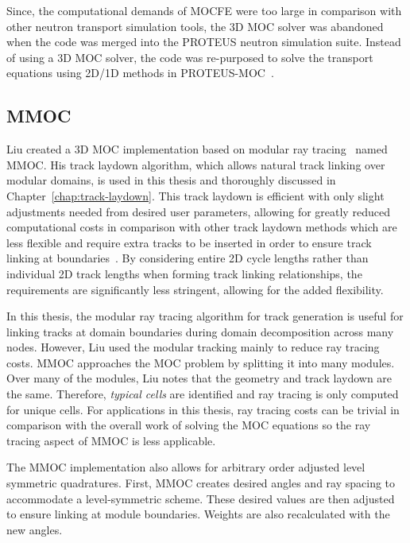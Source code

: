 Since, the computational demands of MOCFE were too large in comparison with other neutron transport simulation tools, the 3D \ac{MOC} solver was abandoned when the code was merged into the PROTEUS neutron simulation suite. Instead of using a 3D \ac{MOC} solver, the code was re-purposed to solve the transport equations using 2D/1D methods in PROTEUS-MOC~\cite{proteus}.

\subsection{MMOC}
\label{sec:mmoc}

Liu created a 3D \ac{MOC} implementation based on modular ray tracing~\cite{liu_mrt} named MMOC. His track laydown algorithm, which allows natural track linking over modular domains, is used in this thesis and thoroughly discussed in Chapter~\ref{chap:track-laydown}. This track laydown is efficient with only slight adjustments needed from desired user parameters, allowing for greatly reduced computational costs in comparison with other track laydown methods which are less flexible and require extra tracks to be inserted in order to ensure track linking at boundaries~\cite{shaner-laydown}. By considering entire 2D cycle lengths rather than individual 2D track lengths when forming track linking relationships, the requirements are significantly less stringent, allowing for the added flexibility.

In this thesis, the modular ray tracing algorithm for track generation is useful for linking tracks at domain boundaries during domain decomposition across many nodes. However, Liu used the modular tracking mainly to reduce ray tracing costs. MMOC approaches the \ac{MOC} problem by splitting it into many modules. Over many of the modules, Liu notes that the geometry and track laydown are the same. Therefore, \textit{typical cells} are identified and ray tracing is only computed for unique cells. For applications in this thesis, ray tracing costs can be trivial in comparison with the overall work of solving the \ac{MOC} equations so the ray tracing aspect of MMOC is less applicable.

The MMOC implementation also allows for arbitrary order adjusted level symmetric quadratures. First, MMOC creates desired angles and ray spacing to accommodate a level-symmetric scheme. These desired values are then adjusted to ensure linking at module boundaries. Weights are also recalculated with the new angles.

